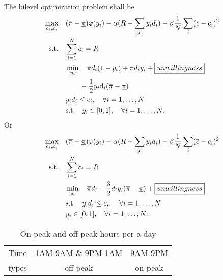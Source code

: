 \documentclass{article}
\begin{document}
The bilevel optimization problem shall be  
\begin{subequations}
  \begin{align}
    \max_{c_{i}, x_{i}} \quad & (\overline{\pi} - \underline{\pi}) \varphi(y_{i}) - \alpha ( R - \sum_{y_{i}} y_{i} d_{i} ) - \beta \frac{1}{N} \sum_{i} (\overline{c} - c_{i})^2 \\
    \mathrm{s.t.} \quad & \sum_{i=1}^{N} c_{i} = R \\
    & \min_{y_{i}} \quad \overline{\pi} d_{i} (1 - y_{i}) + \underline{\pi} d_{i} y_{i} + \boxed{unwillingness} \\
    & \qquad - \frac{1}{2} y_{i} \text{d}_{i} (\overline{\pi} - \underline{\pi}) \notag \\
    & y_{i} d_{i} \le c_{i}, \quad \forall i= 1, \ldots, N \\
    & \mathrm{s.t.} \quad y_{i} \in [0,1], \quad \forall i= 1, \ldots, N.
  \end{align}
\end{subequations}
Or
\begin{subequations}
  \begin{align}
    \max_{c_{i},x_{i}} \quad & (\overline{\pi} - \underline{\pi}) \varphi(y_{i}) - \alpha ( R - \sum_{y_{i}} y_{i} d_{i} ) - \beta \frac{1}{N} \sum_{i} (\overline{c} - c_{i})^2 \\
    \mathrm{s.t.} \quad & \sum_{i=1}^{N} c_{i} = R \\
    & \min_{y_{i}} \quad \overline{\pi} d_{i} - \frac{3}{2} d_{i} y_{i} ( \overline{\pi} - \underline{\pi} ) + \boxed{unwillingness}\\
    & \mathrm{s.t.} \quad y_{i} d_{i} \le c_{i}, \quad \forall i= 1, \ldots, N \\
    & y_{i} \in [0,1], \quad \forall i= 1, \ldots, N.
  \end{align}
\end{subequations}


\begin{table}[h]
  \begin{center}
    \begin{tabular}{ c c c}
      \hline \hline
      Time & 1AM-9AM \& 9PM-1AM & 9AM-9PM \\ [0.5ex]
      types & off-peak & on-peak \\
      \hline \hline 
    \end{tabular}
    \caption{On-peak and off-peak hours per a day}
  \end{center}
\end{table}
\end{document}
